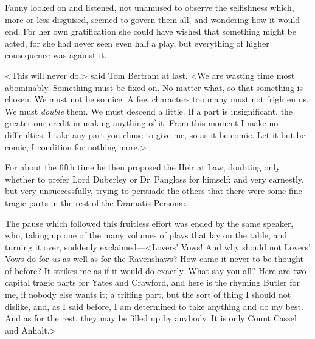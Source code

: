Fanny looked on and listened, not unamused to observe the selfishness which, more or less disguised, seemed to govern them all, and wondering how it would end. For her own gratification she could have wished that something might be acted, for she had never seen even half a play, but everything of higher consequence was against it.

<This will never do,> said Tom Bertram at last. <We are wasting time most abominably. Something must be fixed on. No matter what, so that something is chosen. We must not be so nice. A few characters too many must not frighten us. We must \textit{double}  them. We must descend a little. If a part is insignificant, the greater our credit in making anything of it. From this moment I make no difficulties. I take any part you chuse to give me, so as it be comic. Let it but be comic, I condition for nothing more.>

For about the fifth time he then proposed the Heir at Law, doubting only whether to prefer Lord Duberley or Dr~Pangloss for himself; and very earnestly, but very unsuccessfully, trying to persuade the others that there were some fine tragic parts in the rest of the Dramatis Personæ.

The pause which followed this fruitless effort was ended by the same speaker, who, taking up one of the many volumes of plays that lay on the table, and turning it over, suddenly exclaimed—<Lovers' Vows! And why should not Lovers' Vows do for \textit{us}  as well as for the Ravenshaws? How came it never to be thought of before? It strikes me as if it would do exactly. What say you all? Here are two capital tragic parts for Yates and Crawford, and here is the rhyming Butler for me, if nobody else wants it; a trifling part, but the sort of thing I should not dislike, and, as I said before, I am determined to take anything and do my best. And as for the rest, they may be filled up by anybody. It is only Count Cassel and Anhalt.>

